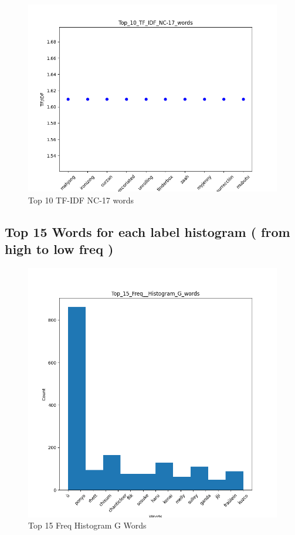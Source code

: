 \documentclass[a4paper]{article}
\begin{document}
\begin{figure}[ht]
    \centering
    \includegraphics[width=1\textwidth]{../stats/Top_10_TF_IDF_NC-17_words.png}
    \caption{Top 10 TF-IDF NC-17 words}
\end{figure}

\FloatBarrier

\subsection*{Top 15 Words for each label histogram ( from high to low freq )}

\begin{figure}[ht]
    \centering
    \includegraphics[width=1\textwidth]{../stats/Top_15_Freq__Histogram_G_Words.png}
    \caption{Top 15 Freq Histogram G Words}
\end{figure}
\end{document}
